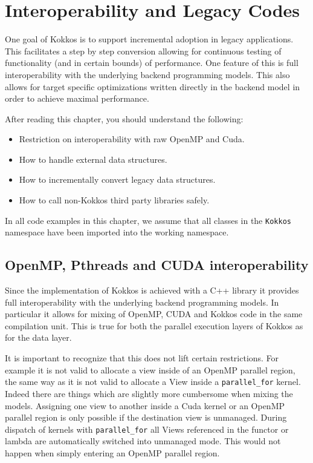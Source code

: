 \section{Interoperability and Legacy Codes}

One goal of Kokkos is to support incremental adoption in legacy 
applications. This facilitates a step by step conversion allowing
for continuous testing of functionality (and in certain bounds) of 
performance. One feature of this is full interoperability with the 
underlying backend programming models. This also allows for 
target specific optimizations written directly in the backend model
in order to achieve maximal performance.

After reading this chapter, you should understand the following:
\begin{itemize}
\item Restriction on interoperability with raw OpenMP and Cuda.
\item How to handle external data structures.
\item How to incrementally convert legacy data structures.
\item How to call non-Kokkos third party libraries safely.
\end{itemize}
In all code examples in this chapter, we assume that all classes in
the \lstinline!Kokkos! namespace have been imported into the working
namespace.

\subsection{OpenMP, Pthreads and CUDA interoperability}

Since the implementation of Kokkos is achieved with a C++ library
it provides full interoperability with the underlying backend programming
models. In particular it allows for mixing of OpenMP, CUDA and Kokkos 
code in the same compilation unit. This is true for both the parallel 
execution layers of Kokkos as for the data layer. 

It is important to recognize that this does not lift certain restrictions. 
For example it is not valid to allocate a view inside of an OpenMP 
parallel region, the same way as it is not valid to allocate a View 
inside a \lstinline|parallel_for| kernel. Indeed there are things which 
are slightly more cumbersome when mixing the models. Assigning 
one view to another inside a Cuda kernel or an OpenMP parallel 
region is only possible if the destination view is unmanaged. 
During dispatch of kernels with \lstinline|parallel_for|  all Views referenced 
in the functor or lambda are automatically switched into unmanaged 
mode. This would not happen when simply entering an OpenMP 
parallel region. 

